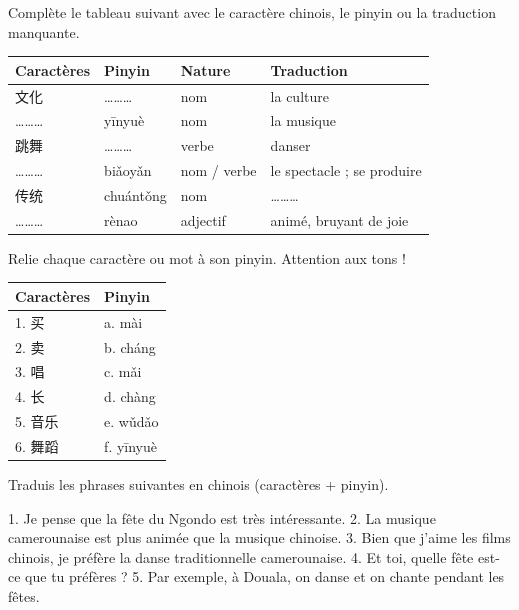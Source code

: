 \documentclass[11pt]{article}
\newcounter{popsec}
\newcounter{popsub}
\newcommand{\courssub}[1]{%
  \stepcounter{popsub}%
  \par\vspace{9pt}\noindent{\popxbold\fontsize{11.5}{13}\selectfont\color{popink}{\color{poporange}\thepopsec.\thepopsub}\hspace{6pt}#1}\par\nopagebreak\vspace{4pt}
}
\begin{document}
\begin{exercice}
Complète le tableau suivant avec le caractère chinois, le pinyin ou la traduction manquante.

\begin{center}
\begin{tabularx}{\linewidth}{|X|X|X|X|}
\hline
\rowcolor{popblueL} Caractères & Pinyin & Nature & Traduction \\
\hline
文化 & \ldots\ldots\ldots & nom & la culture \\
\hline
\ldots\ldots\ldots & yīnyuè & nom & la musique \\
\hline
跳舞 & \ldots\ldots\ldots & verbe & danser \\
\hline
\ldots\ldots\ldots & biǎoyǎn & nom / verbe & le spectacle ; se produire \\
\hline
传统 & chuántǒng & nom & \ldots\ldots\ldots \\
\hline
\ldots\ldots\ldots & rènao & adjectif & animé, bruyant de joie \\
\hline
\end{tabularx}
\end{center}
\end{exercice}

\begin{exercice}
Relie chaque caractère ou mot à son pinyin. Attention aux tons !

\begin{center}
\begin{tabularx}{\linewidth}{|X|X|}
\hline
\rowcolor{popblueL} Caractères & Pinyin \\
\hline
1. 买 & a. mài \\
\hline
2. 卖 & b. cháng \\
\hline
3. 唱 & c. mǎi \\
\hline
4. 长 & d. chàng \\
\hline
5. 音乐 & e. wǔdǎo \\
\hline
6. 舞蹈 & f. yīnyuè \\
\hline
\end{tabularx}
\end{center}
\end{exercice}

\courssub{Je m'entraîne}

\begin{exercice}
Traduis les phrases suivantes en chinois (caractères + pinyin).

1. Je pense que la fête du Ngondo est très intéressante.
2. La musique camerounaise est plus animée que la musique chinoise.
3. Bien que j'aime les films chinois, je préfère la danse traditionnelle camerounaise.
4. Et toi, quelle fête est-ce que tu préfères ?
5. Par exemple, à Douala, on danse et on chante pendant les fêtes.
\end{exercice}
\end{document}
